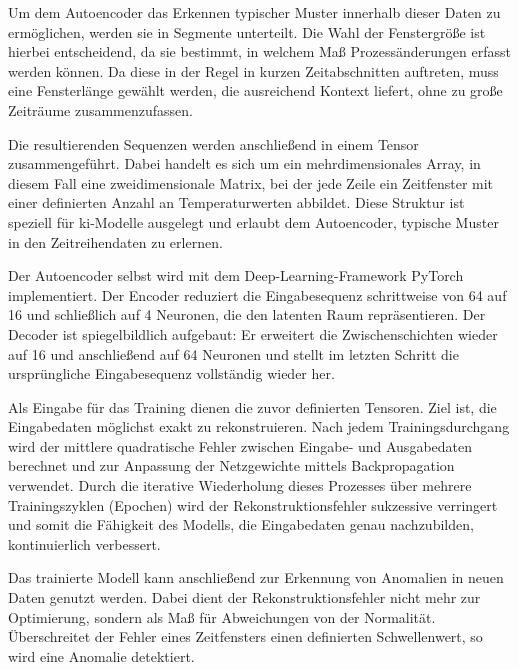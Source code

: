 Um dem Autoencoder das Erkennen typischer Muster innerhalb dieser Daten zu ermöglichen, werden sie in Segmente unterteilt.
Die Wahl der Fenstergröße ist hierbei entscheidend, da sie bestimmt, in welchem Maß Prozessänderungen erfasst werden können.
Da diese in der Regel in kurzen Zeitabschnitten auftreten, muss eine Fensterlänge gewählt werden, die ausreichend Kontext liefert, ohne zu große Zeiträume zusammenzufassen.

Die resultierenden Sequenzen werden anschließend in einem Tensor zusammengeführt. 
Dabei handelt es sich um ein mehrdimensionales Array, in diesem Fall eine zweidimensionale Matrix, bei der jede Zeile ein Zeitfenster mit einer definierten Anzahl an Temperaturwerten abbildet. 
Diese Struktur ist speziell für \acs{ki}-Modelle ausgelegt und erlaubt dem Autoencoder, typische Muster in den Zeitreihendaten zu erlernen.

Der Autoencoder selbst wird mit dem Deep-Learning-Framework PyTorch \cite{PyTorch} implementiert.
Der Encoder reduziert die Eingabesequenz schrittweise von 64 auf 16 und schließlich auf 4 Neuronen, die den latenten Raum repräsentieren.
Der Decoder ist spiegelbildlich aufgebaut: Er erweitert die Zwischenschichten wieder auf 16 und anschließend auf 64 Neuronen und stellt im letzten Schritt die ursprüngliche Eingabesequenz vollständig wieder her.

Als Eingabe für das Training dienen die zuvor definierten Tensoren.
Ziel ist, die Eingabedaten möglichst exakt zu rekonstruieren.
Nach jedem Trainingsdurchgang wird der mittlere quadratische Fehler zwischen Eingabe- und Ausgabedaten berechnet und zur Anpassung der Netzgewichte mittels Backpropagation verwendet.
Durch die iterative Wiederholung dieses Prozesses über mehrere Trainingszyklen (Epochen) wird der Rekonstruktionsfehler sukzessive verringert und somit die Fähigkeit des Modells, die Eingabedaten genau nachzubilden, kontinuierlich verbessert.

Das trainierte Modell kann anschließend zur Erkennung von Anomalien in neuen Daten genutzt werden.
Dabei dient der Rekonstruktionsfehler nicht mehr zur Optimierung, sondern als Maß für Abweichungen von der Normalität.
Überschreitet der Fehler eines Zeitfensters einen definierten Schwellenwert, so wird eine Anomalie detektiert.


